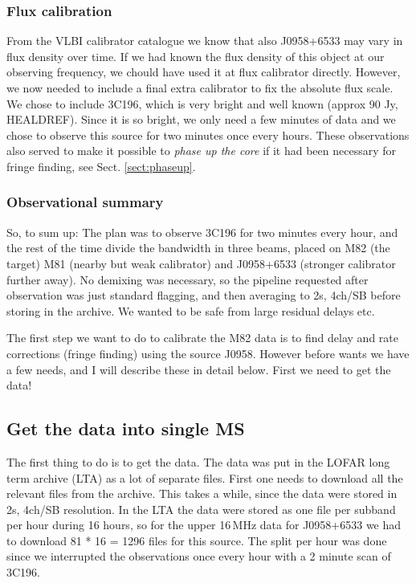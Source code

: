 \subsubsection{Flux calibration}
From the VLBI calibrator catalogue we know that also J0958+6533 may vary in
flux density over time. If we had known the flux density
of this object at our observing frequency, we chould have used it at flux
calibrator directly.  However, we now needed to include a final extra
calibrator to fix the absolute flux scale. We chose to include 3C196, which is
very bright and well known (approx 90 Jy, HEALDREF). Since it is so bright,
we only need a few minutes of data and we chose to observe this source 
for two minutes once every hours. These observations also served to 
make it possible to \emph{phase up the core} if it had been necessary for 
fringe finding, see Sect. \ref{sect:phaseup}.

\subsubsection{Observational summary}
So, to sum up: The plan was to observe 3C196 for two minutes every hour, and 
the rest of the time divide the bandwidth in three beams, placed on M82 (the target)
M81 (nearby but weak calibrator) and J0958+6533 (stronger calibrator further away).
No demixing was necessary, so the pipeline requested after observation was just 
standard flagging, and then averaging to 2s, 4ch/SB before storing in the archive.
We wanted to be safe from large residual delays etc.

The first step we want to do to calibrate the M82 data is to find delay and rate corrections
(fringe finding) using the source J0958. However before wants we have a few needs, 
and I will describe these in detail below. First we need to get the data!

\subsection{Get the data into single MS}
\label{sect:fakedata}
The first thing to do is to get the data. The data was put in the LOFAR long
term archive (LTA) as a lot of separate files. First one needs to download
all the relevant files from the archive. This
takes a while, since the data were stored in 2s, 4ch/SB resolution.
In the LTA the data were stored as one file per subband per hour
during 16 hours, so for the upper 16\,MHz data for J0958+6533 we had to download
81 * 16 = 1296 files for this source. 
The split per hour was done since we interrupted the observations once
every hour with a 2 minute scan of 3C196.

